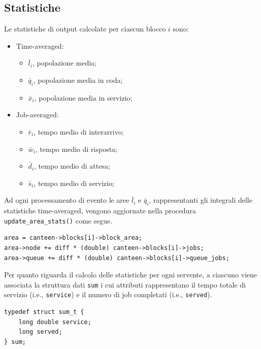 \documentclass{article}
\begin{document}
\subsection{Statistiche}

Le statistiche di output calcolate per ciascun blocco $i$ sono: 

\begin{itemize}
    \item Time-averaged:
    \begin{itemize}
        \item $\bar{l}_i$, popolazione media;
        \item $\bar{q}_i$, popolazione media in coda;
        \item $\bar{x}_i$, popolazione media in servizio;
    \end{itemize}
    \item Job-averaged:
    \begin{itemize}
        \item $\bar{r}_i$, tempo medio di interarrivo;
        \item $\bar{w}_i$, tempo medio di risposta;
        \item $\bar{d}_i$, tempo medio di attesa;
        \item $\bar{s}_i$, tempo medio di servizio;
    \end{itemize}
\end{itemize}

Ad ogni processamento di evento le aree $\bar{l}_i$ e $\bar{q}_i$, rappresentanti gli integrali delle statistiche time-averaged, vengono aggiornate nella procedura \texttt{update\_area\_stats()} come segue.

\begin{lstlisting}
area = canteen->blocks[i]->block_area;
area->node += diff * (double) canteen->blocks[i]->jobs;
area->queue += diff * (double) canteen->blocks[i]->queue_jobs;
\end{lstlisting}

Per quanto riguarda il calcolo delle statistiche per ogni servente, a ciascuno viene associata la struttura dati \texttt{sum} i cui attributi rappresentano il tempo totale di servizio (i.e., \texttt{service}) e il numero di job completati (i.e., \texttt{served}). 

\begin{lstlisting}
typedef struct sum_t {             
    long double service;           
    long served;                   
} sum;
\end{lstlisting}
\end{document}
